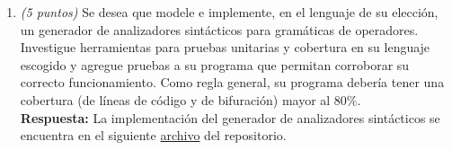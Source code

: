 \documentclass[a4paper,10pt]{article}
\begin{document}
\begin{enumerate}
\begin{enumerate}
            \textbf{Respuesta:} La implementaci\'on del reconocedor recursivo descendente se 
            encuentra en el siguiente 
            \href{https://github.com/ArriagaAmin/LenguajesIIParcial1/blob/main/Pregunta2/TryCatchLector}{archivo} 
            del repositorio. Debe correr el script con \verb|python3|, el cual le proporcionar\'a
            un prompt para usar el reconocedor, cuya sintaxis es:
            
            \begin{verbatim}
                            $> PARSE [<string> ...]
                            $> SALIR
            \end{verbatim}

        \end{enumerate}

        \item \textit{(5 puntos)} Se desea que modele e implemente, en el lenguaje de su elecci\'on, 
        un generador de analizadores sint\'acticos para gram\'aticas de operadores. Investigue 
        herramientas para pruebas unitarias y cobertura en su lenguaje escogido y agregue pruebas a 
        su programa que permitan corroborar su correcto funcionamiento. Como regla general, su programa 
        deber\'ia tener una cobertura (de l\'ineas de c\'odigo y de bifuraci\'on) mayor al 80\%. \\

        \textbf{Respuesta:} La implementaci\'on del generador de analizadores sint\'acticos se 
        encuentra en el siguiente 
        \href{https://github.com/ArriagaAmin/LenguajesIIParcial1/blob/main/Pregunta2/TryCatchLector}{archivo} 
        del repositorio.
    \end{enumerate}
\end{document}
